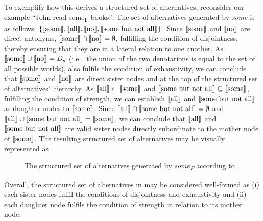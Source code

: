 To exemplify how this derives a structured set of alternatives, reconsider our example \enquote{John read some\textsubscript{F} books}: The set of alternatives generated by \textit{some} is as follows: $\{\intension[]{some},\intension[]{all},\intension[]{no},\intension[]{some but not all}\}$. Since $\intension[]{some}$ and $\intension[]{no}$ are direct antonyms, $\intension[]{some}\cap\intension[]{no}=\emptyset$, fulfilling the condition of disjointness, thereby ensuring that they are in a lateral relation to one another. As $\intension[]{some}\cup\intension[]{no}=D_s$ (i.e.,~the union of the two denotations is equal to the set of all possible worlds), also fulfils the condition of exhaustivity, we can conclude that $\intension[]{some}$ and $\intension[]{no}$ are direct sister nodes and at the top of the structured set of alternatives' hierarchy. As $\intension[]{all}\subset\intension[]{some}$ and $\intension[]{some but not all}\subseteq\intension[]{some}$, fulfilling the condition of strength, we can establish $\intension[]{all}$ and $\intension[]{some but not all}$ as daughter nodes to $\intension[]{some}$. Since $\intension[]{all}\cap\intension[]{some but not all}=\emptyset$ and $\intension[]{all}\cup\intension[]{some but not all}=\intension[]{some}$, we can conclude that $\intension[]{all}$ and $\intension[]{some but not all}$ are valid sister nodes directly subordinate to the mother node of $\intension[]{some}$. The resulting structured set of alternatives may be visually represented as .
\begin{figure}[!htb]
    \centering\hspace{-7cm}
    
    \caption{The structured set of alternatives generated by \textit{some\textsubscript{F}} according to \textcite{Ippolito2020}.}
\end{figure}

\noindent Overall, the structured set of alternatives in  may be considered well-formed as (i) each sister nodes fulfil the conditions of disjointness and exhaustivity and (ii) each daughter node fulfils the condition of strength in relation to its mother node.

